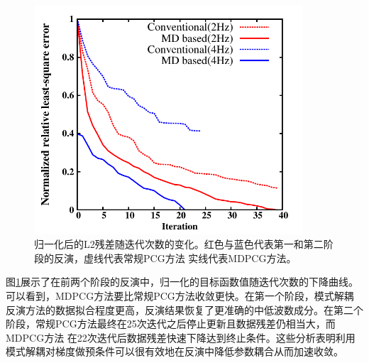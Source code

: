 \begin{figure}[!htb]
    \begin{center}
        \includegraphics[width=10cm]{Figure/chapter02/tariqsugresult/Fig/L2.pdf}
        \caption{
			归一化后的L2残差随迭代次数的变化。红色与蓝色代表第一和第二阶段的反演，虚线代表常规PCG方法
			实线代表MDPCG方法。
    }
    \label{fig:L2}
    \end{center}
\end{figure}
图\ref{fig:L2}展示了在前两个阶段的反演中，归一化的目标函数值随迭代次数的下降曲线。可以看到，MDPCG方法要比常规PCG方法收敛更快。在第一个阶段，模式解耦
反演方法的数据拟合程度更高，反演结果恢复了更准确的中低波数成分。在第二个阶段，常规PCG方法最终在25次迭代之后停止更新且数据残差仍相当大，而MDPCG方法
在22次迭代后数据残差快速下降达到终止条件。这些分析表明利用模式解耦对梯度做预条件可以很有效地在反演中降低参数耦合从而加速收敛。

